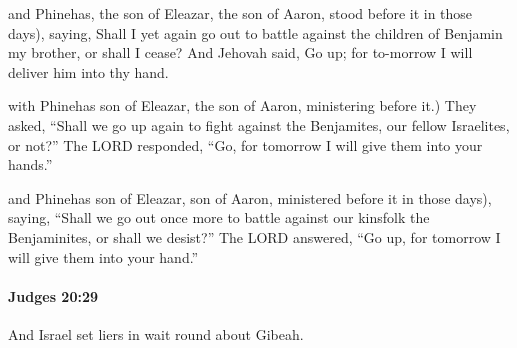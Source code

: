 			\begin{versebox}
					\item[BHS] 
					\item[ASV] and Phinehas, the son of Eleazar, the son of Aaron, stood before it in those days), saying, Shall I yet again go out to battle against the children of Benjamin my brother, or shall I cease? And Jehovah said, Go up; for to-morrow I will deliver him into thy hand.
					\item[NIV] with Phinehas son of Eleazar, the son of Aaron, ministering before it.) They asked, “Shall we go up again to fight against the Benjamites, our fellow Israelites, or not?” The LORD responded, “Go, for tomorrow I will give them into your hands.”
					\item[NRSV] and Phinehas son of Eleazar, son of Aaron, ministered before it in those days), saying, “Shall we go out once more to battle against our kinsfolk the Benjaminites, or shall we desist?” The LORD answered, “Go up, for tomorrow I will give them into your hand.”
			\end{versebox}

		\paragraph{Judges 20:29} %
			\label{JUDGES-20-29}

			And Israel set liers in wait round about Gibeah.

